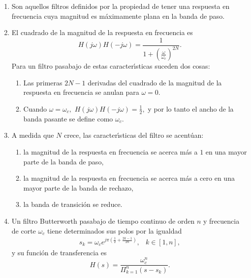 \begin{enumerate}
\item   Son aquellos filtros definidos por la propiedad de tener una respuesta en frecuencia cuya
magnitud es m\'{a}ximamente plana en la banda de paso. 
                
\item   El cuadrado de la magnitud de la respuesta en frecuencia es 
\begin{equation}
  H\left( j\omega \right) H\left( -j\omega \right) =
   \frac{1}{1+\left( \frac{\omega }{\omega _{c}}\right) ^{2N}}.
\end{equation}
Para un filtro pasabajo de estas caracter\'{\i}sticas suceden dos cosas:
\begin{enumerate}
    \item  Las primeras $2N-1$ derivadas del cuadrado de la magnitud de la respuesta en frecuencia se 
      anulan para $\omega =0$.

    \item  Cuando $\omega =\omega _{c},$ $H\left( j\omega \right) H\left(-j\omega \right) =\frac{1}{2},$ 
      y por lo tanto el ancho de la banda pasante se define como $\omega _{c}.$
\end{enumerate}

\item   A medida que $N$ crece, las caracter\'{\i}sticas del filtro se acent\'{u}an: 
  \begin{enumerate}
     \item   la magnitud de la respuesta en frecuencia se acerca m\'{a}s a $1$ en una mayor parte de la 
       banda de paso, 
        
     \item   la magnitud de la respuesta en frecuencia se acerca m\'{a}s a cero en una mayor parte de la 
       banda de rechazo, 
     
     \item   la banda de transici\'{o}n se reduce.   
  \end{enumerate}

\item Un filtro Butterworth pasabajo de tiempo continuo de orden $n$ y frecuencia de corte $\omega _{c}$ 
tiene determinados sus polos por la igualdad
\begin{equation}
  \begin{array}{cc}
     s_{k}= \omega_{c} e^{j \pi (\frac{1}{2}+\frac{2k-1}{2 n})}, &  k \in [1,n],
  \end{array}
\end{equation}
y su funci\'{o}n de transferencia es
\begin{equation}
  H(s) = \frac{\omega_{c}^{n}}{\Pi_{k=1}^{n} (s-s_{k})}.
\end{equation}


\end{enumerate}
